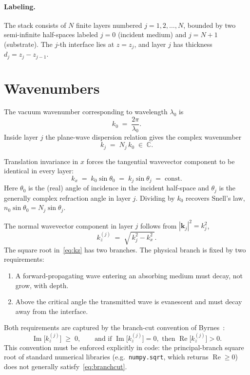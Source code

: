 \documentclass[aps,prb,onecolumn,superscriptaddress,nofootinbib,11pt]{revtex4-2}
\DeclareMathOperator{\Rey}{Re}
\DeclareMathOperator{\Imy}{Im}
\begin{document}
\paragraph{Labeling.}
The stack consists of $N$ finite layers numbered $j = 1, 2, \dots, N$, bounded by two semi-infinite half-spaces labeled $j = 0$ (incident medium) and $j = N+1$ (substrate). The $j$-th interface lies at $z = z_j$, and layer $j$ has thickness $d_j = z_j - z_{j-1}$.

\section{Wavenumbers}

The vacuum wavenumber corresponding to wavelength $\lambda_0$ is
\begin{equation}
  k_0 \;=\; \frac{2\pi}{\lambda_0}.
\end{equation}
Inside layer $j$ the plane-wave dispersion relation gives the complex wavenumber
\begin{equation}
  k_j \;=\; N_j \, k_0 \;\in\; \mathbb{C}.
\end{equation}

Translation invariance in $x$ forces the tangential wavevector component to be identical in every layer:
\begin{equation}
  k_x \;=\; k_0 \sin\theta_0 \;=\; k_j \sin\theta_j \;=\; \text{const.}
  \label{eq:snell}
\end{equation}
Here $\theta_0$ is the (real) angle of incidence in the incident half-space and $\theta_j$ is the generally complex refraction angle in layer $j$. Dividing by $k_0$ recovers Snell's law, $n_0 \sin\theta_0 = N_j \sin\theta_j$.

The normal wavevector component in layer $j$ follows from $|\mathbf{k}_j|^2 = k_j^2$,
\begin{equation}
  k_z^{(j)} \;=\; \sqrt{\,k_j^2 - k_x^2\,}.
  \label{eq:kz}
\end{equation}
The square root in~\eqref{eq:kz} has two branches. The physical branch is fixed by two requirements:
\begin{enumerate}
  \item A forward-propagating wave entering an absorbing medium must decay, not grow, with depth.
  \item Above the critical angle the transmitted wave is evanescent and must decay away from the interface.
\end{enumerate}
Both requirements are captured by the branch-cut convention of Byrnes~\cite{Byrnes2020}:
\begin{equation}
  \Imy\!\bigl[k_z^{(j)}\bigr] \;\ge\; 0,
  \qquad
  \text{and if } \Imy\!\bigl[k_z^{(j)}\bigr] = 0,
  \text{ then } \Rey\!\bigl[k_z^{(j)}\bigr] > 0.
  \label{eq:branchcut}
\end{equation}
This convention must be enforced explicitly in code: the principal-branch square root of standard numerical libraries (e.g.\ \texttt{numpy.sqrt}, which returns $\Rey \ge 0$) does not generally satisfy~\eqref{eq:branchcut}.
\end{document}
